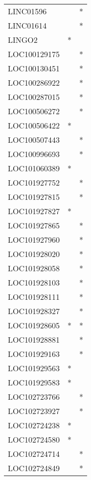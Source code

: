 \begin{longtable}{lcc}
LINC01596      &           &       * \\
LINC01614      &           &       * \\
LINGO2         &         * &         \\
LOC100129175   &           &       * \\
LOC100130451   &           &       * \\
LOC100286922   &           &       * \\
LOC100287015   &           &       * \\
LOC100506272   &           &       * \\
LOC100506422   &         * &         \\
LOC100507443   &           &       * \\
LOC100996693   &           &       * \\
LOC101060389   &         * &         \\
LOC101927752   &           &       * \\
LOC101927815   &           &       * \\
LOC101927827   &         * &         \\
LOC101927865   &           &       * \\
LOC101927960   &           &       * \\
LOC101928020   &           &       * \\
LOC101928058   &           &       * \\
LOC101928103   &           &       * \\
LOC101928111   &           &       * \\
LOC101928327   &           &       * \\
LOC101928605   &         * &       * \\
LOC101928881   &           &       * \\
LOC101929163   &           &       * \\
LOC101929563   &         * &         \\
LOC101929583   &         * &         \\
LOC102723766   &           &       * \\
LOC102723927   &           &       * \\
LOC102724238   &         * &         \\
LOC102724580   &         * &         \\
LOC102724714   &           &       * \\
LOC102724849   &           &       * \\

\end{longtable}
